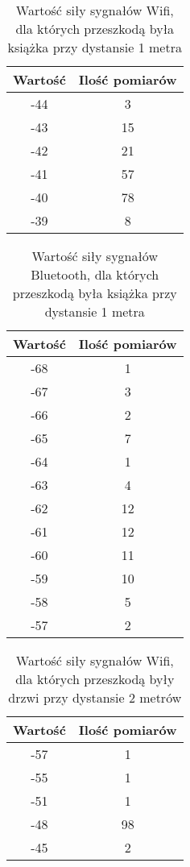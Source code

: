 \documentclass{article}
\begin{document}
\begin{table}[H]
	\caption {Wartość siły sygnałów Wifi, dla których przeszkodą była książka przy dystansie 1 metra} 
\begin{center}
	\begin{tabular}{|c|c|}
		\hline
		Wartość & Ilość pomiarów \\ 
		\hline
		-44 & 3\\
		\hline
		-43 & 15\\
		\hline
		-42 & 21\\
		\hline
		-41 & 57\\
		\hline
		-40 & 78\\
		\hline
		-39 & 8\\
		\hline
	\end{tabular}
\end{center}
\end{table}
\begin{table}[H]
	\caption {Wartość siły sygnałów Bluetooth, dla których przeszkodą była książka przy dystansie 1 metra}
\begin{center}
		\begin{tabular}{|c|c|}
			\hline
			Wartość & Ilość pomiarów \\ 
			\hline
			-68 & 1\\
			\hline
			-67 & 3\\
			\hline
			-66 & 2\\
			\hline
			-65 & 7\\
			\hline
			-64 & 1\\
			\hline
			-63 & 4\\
			\hline
			-62 & 12\\
			\hline
			-61 & 12\\
			\hline
			-60 & 11\\
			\hline
			-59 & 10\\
			\hline
			-58 & 5\\
			\hline
			-57 & 2\\
			\hline
		\end{tabular}
\end{center}
\end{table}
\begin{table}[H]
	\caption {Wartość siły sygnałów Wifi, dla których przeszkodą były drzwi przy dystansie 2 metrów}
\begin{center}
		\begin{tabular}{|c|c|}
			\hline
			Wartość & Ilość pomiarów \\ 
			\hline
			-57 & 1\\
			\hline
			-55 & 1\\
			\hline
			-51 & 1\\
			\hline
			-48 & 98\\
			\hline
			-45 & 2\\
			\hline
		\end{tabular}
\end{center}
\end{table}
\end{document}

